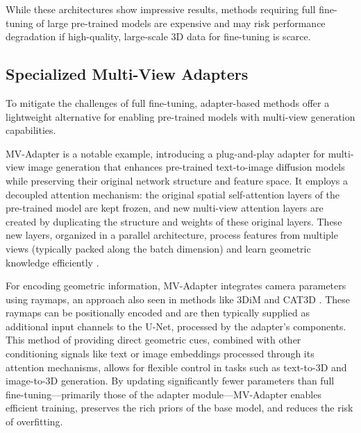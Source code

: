While these architectures show impressive results, methods requiring full fine-tuning of large pre-trained models are expensive and may risk performance degradation if high-quality, large-scale 3D data for fine-tuning is scarce.

\subsection{Specialized Multi-View Adapters}
To mitigate the challenges of full fine-tuning, adapter-based methods offer a lightweight alternative for enabling pre-trained models with multi-view generation capabilities.

MV-Adapter \cite{mvadapter} is a notable example, introducing a plug-and-play adapter for multi-view image generation that enhances pre-trained text-to-image diffusion models while preserving their original network structure and feature space. It employs a decoupled attention mechanism: the original spatial self-attention layers of the pre-trained model are kept frozen, and new multi-view attention layers are created by duplicating the structure and weights of these original layers. These new layers, organized in a parallel architecture, process features from multiple views (typically packed along the batch dimension) and learn geometric knowledge efficiently \cite{mvadapter}.

For encoding geometric information, MV-Adapter \cite{mvadapter} integrates camera parameters using raymaps, an approach also seen in methods like 3DiM \cite{novelviewsynthesisdiffusion} and CAT3D \cite{cat3d}. These raymaps can be positionally encoded and are then typically supplied as additional input channels to the U-Net, processed by the adapter's components. This method of providing direct geometric cues, combined with other conditioning signals like text or image embeddings processed through its attention mechanisms, allows for flexible control in tasks such as text-to-3D and image-to-3D generation. By updating significantly fewer parameters than full fine-tuning—primarily those of the adapter module—MV-Adapter enables efficient training, preserves the rich priors of the base model, and reduces the risk of overfitting.